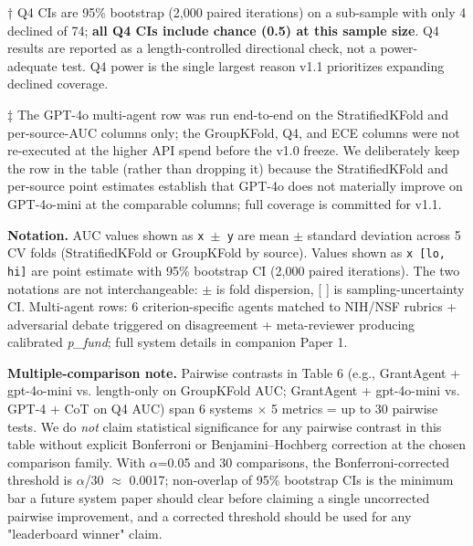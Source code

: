 \documentclass[11pt]{article}
\begin{document}
† Q4 CIs are 95\% bootstrap (2,000 paired iterations) on a sub-sample with only 4 declined of 74; \textbf{all Q4 CIs include chance (0.5) at this sample size}. Q4 results are reported as a length-controlled directional check, not a power-adequate test. Q4 power is the single largest reason v1.1 prioritizes expanding declined coverage.

‡ The GPT-4o multi-agent row was run end-to-end on the StratifiedKFold and per-source-AUC columns only; the GroupKFold, Q4, and ECE columns were not re-executed at the higher API spend before the v1.0 freeze. We deliberately keep the row in the table (rather than dropping it) because the StratifiedKFold and per-source point estimates establish that GPT-4o does not materially improve on GPT-4o-mini at the comparable columns; full coverage is committed for v1.1.

\textbf{Notation.} AUC values shown as \texttt{x $\pm$ y} are mean $\pm$ standard deviation across 5 CV folds (StratifiedKFold or GroupKFold by source). Values shown as \texttt{x [lo, hi]} are point estimate with 95\% bootstrap CI (2,000 paired iterations). The two notations are not interchangeable: $\pm$ is fold dispersion, [ ] is sampling-uncertainty CI. Multi-agent rows: 6 criterion-specific agents matched to NIH/NSF rubrics + adversarial debate triggered on disagreement + meta-reviewer producing calibrated \emph{p\_fund}; full system details in companion Paper 1.

\textbf{Multiple-comparison note.} Pairwise contrasts in Table 6 (e.g., GrantAgent + gpt-4o-mini vs. length-only on GroupKFold AUC; GrantAgent + gpt-4o-mini vs. GPT-4 + CoT on Q4 AUC) span 6 systems $\times$ 5 metrics = up to 30 pairwise tests. We do \emph{not} claim statistical significance for any pairwise contrast in this table without explicit Bonferroni or Benjamini--Hochberg correction at the chosen comparison family. With $\alpha$=0.05 and 30 comparisons, the Bonferroni-corrected threshold is $\alpha$/30 $\approx$ 0.0017; non-overlap of 95\% bootstrap CIs is the minimum bar a future system paper should clear before claiming a single uncorrected pairwise improvement, and a corrected threshold should be used for any "leaderboard winner" claim.
\end{document}

